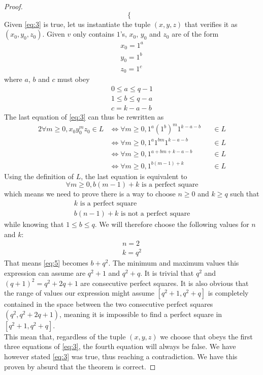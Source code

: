 {\begin{proof}
\begin{equation}
\begin{cases}
	\end{cases}
\end{equation}
Given \eqref{eq:3} is true, let us instantiate the tuple $(x,y,z)$ that verifies it as $(x_0,y_0,z_0)$. Given $v$ only contains $1$'s, $x_0$, $y_0$ and $z_0$ are of the form
\begin{gather*}
	x_0=1^a\\
	y_0=1^b\\
	z_0=1^c
\end{gather*}
where $a$, $b$ and $c$ must obey
\begin{gather*}
	0 \leq a \leq q-1\\
	1 \leq b \leq q-a\\
	c = k-a-b
\end{gather*}
The last equation of \eqref{eq:3} can thus be rewritten as
\begin{alignat*}{2}
	\forall m \geq 0, x_0 y_0^m z_0 \in L
	&\iff \forall m \geq 0, 1^a {(1^b)}^m 1^{k-a-b} &&\in L\\
	&\iff \forall m \geq 0, 1^a 1^{bm} 1^{k-a-b}    &&\in L\\
	&\iff \forall m \geq 0, 1^{a+bm+k-a-b}          &&\in L\\
	&\iff \forall m \geq 0, 1^{b(m-1)+k}            &&\in L
\end{alignat*}
Using the definition of $L$, the last equation is equivalent to
\begin{equation*}
	\forall m \geq 0, b(m-1)+k \text{ is a perfect square}\end{equation*}
which means we need to prove there is a way to choose $n \geq 0$ and $k \geq q$ such that
\begin{gather}
	\label{eq:4} k \text{ is a perfect square}\\
	\label{eq:5} b(n-1)+k \text{ is not a perfect square}
\end{gather}
while knowing that $1 \leq b \leq q$.
We will therefore choose the following values for $n$ and $k$:
\begin{gather*}
	n = 2\\
	k = q^2
\end{gather*}
That means \eqref{eq:5} becomes $b+q^2$. The minimum and maximum values this expression can assume are $q^2+1$ and $q^2+q$. It is trivial that $q^2$ and $(q+1)^2=q^2+2q+1$ are consecutive perfect squares. It is also obvious that the range of values our expression might assume $[q^2+1,q^2+q]$ is completely contained in the space between the two consecutive perfect squares $(q^2, q^2+2q+1)$, meaning it is impossible to find a perfect square in $[q^2+1,q^2+q]$.\\
This mean that, regardless of the tuple $(x,y,z)$ we choose that obeys the first three equations of \eqref{eq:3}, the fourth equation will always be false. We have however stated \eqref{eq:3} was true, thus reaching a contradiction. We have this proven by absurd that the theorem is correct.
\end{proof}
}
